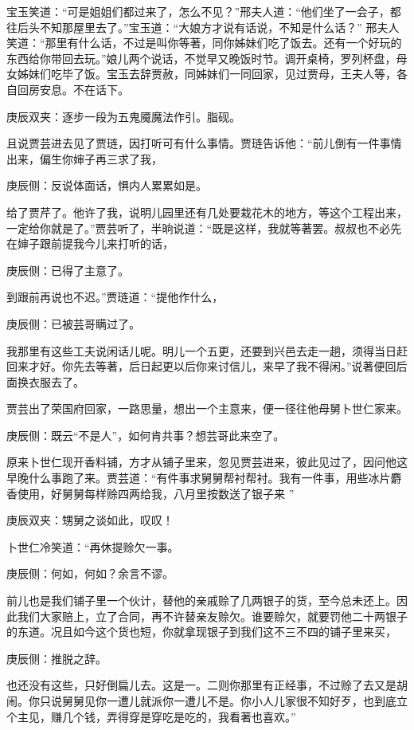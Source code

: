 \begin{parag}
    宝玉笑道：“可是姐姐们都过来了，怎么不见？”邢夫人道：“他们坐了一会子，都往后头不知那屋里去了。”宝玉道：“大娘方才说有话说，不知是什么话？” 邢夫人笑道：“那里有什么话，不过是叫你等著，同你姊妹们吃了饭去。还有一个好玩的东西给你带回去玩。”娘儿两个说话，不觉早又晚饭时节。调开桌椅，罗列杯盘，母女姊妹们吃毕了饭。宝玉去辞贾赦，同姊妹们一同回家，见过贾母，王夫人等，各自回房安息。不在话下。\begin{note}庚辰双夹：逐步一段为五鬼魇魔法作引。脂砚。\end{note}
\end{parag}


\begin{parag}
    且说贾芸进去见了贾琏，因打听可有什么事情。贾琏告诉他：“前儿倒有一件事情出来，偏生你婶子再三求了我，\begin{note}庚辰侧：反说体面话，惧内人累累如是。\end{note}给了贾芹了。他许了我，说明儿园里还有几处要栽花木的地方，等这个工程出来，一定给你就是了。”贾芸听了，半晌说道：“既是这样，我就等著罢。叔叔也不必先在婶子跟前提我今儿来打听的话，\begin{note}庚辰侧：已得了主意了。\end{note}到跟前再说也不迟。”贾琏道：“提他作什么，\begin{note}庚辰侧：已被芸哥瞒过了。\end{note}我那里有这些工夫说闲话儿呢。明儿一个五更，还要到兴邑去走一趟，须得当日赶回来才好。你先去等著，后日起更以后你来讨信儿，来早了我不得闲。”说著便回后面换衣服去了。
\end{parag}


\begin{parag}
    贾芸出了荣国府回家，一路思量，想出一个主意来，便一径往他母舅卜世仁家来。\begin{note}庚辰侧：既云“不是人”，如何肯共事？想芸哥此来空了。\end{note}原来卜世仁现开香料铺，方才从铺子里来，忽见贾芸进来，彼此见过了，因问他这早晚什么事跑了来。贾芸道：“有件事求舅舅帮衬帮衬。我有一件事，用些冰片麝香使用，好舅舅每样赊四两给我，八月里按数送了银子来 ”\begin{note}庚辰双夹：甥舅之谈如此，叹叹！\end{note}卜世仁冷笑道：“再休提赊欠一事。\begin{note}庚辰侧：何如，何如？余言不谬。\end{note}前儿也是我们铺子里一个伙计，替他的亲戚赊了几两银子的货，至今总未还上。因此我们大家赔上，立了合同，再不许替亲友赊欠。谁要赊欠，就要罚他二十两银子的东道。况且如今这个货也短，你就拿现银子到我们这不三不四的铺子里来买，\begin{note}庚辰侧：推脱之辞。\end{note}也还没有这些，只好倒扁儿去。这是一。二则你那里有正经事，不过赊了去又是胡闹。你只说舅舅见你一遭儿就派你一遭儿不是。你小人儿家很不知好歹，也到底立个主见，赚几个钱，弄得穿是穿吃是吃的，我看著也喜欢。”
\end{parag}


